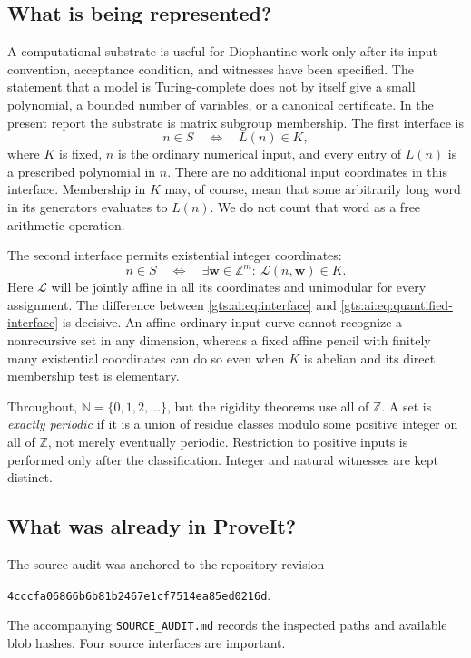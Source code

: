 \documentclass[11pt,letterpaper]{article}
\theoremstyle{definition}
\theoremstyle{remark}
\newcommand{\Z}{\mathbb Z}
\newcommand{\N}{\mathbb N}
\begin{document}
\subsection{What is being represented?}
A computational substrate is useful for Diophantine work only after its input convention, acceptance condition, and witnesses have been specified. The statement that a model is Turing-complete does not by itself give a small polynomial, a bounded number of variables, or a canonical certificate. In the present report the substrate is matrix subgroup membership. The first interface is
\begin{equation}\label{gts:ai:eq:interface}
 n\in S \quad\Longleftrightarrow\quad L(n)\in K,
\end{equation}
where $K$ is fixed, $n$ is the ordinary numerical input, and every entry of $L(n)$ is a prescribed polynomial in $n$. There are no additional input coordinates in this interface. Membership in $K$ may, of course, mean that some arbitrarily long word in its generators evaluates to $L(n)$. We do not count that word as a free arithmetic operation.

The second interface permits existential integer coordinates:
\begin{equation}\label{gts:ai:eq:quantified-interface}
 n\in S \quad\Longleftrightarrow\quad
 \exists\mathbf w\in\Z^m:\ \mathcal L(n,\mathbf w)\in K.
\end{equation}
Here $\mathcal L$ will be jointly affine in all its coordinates and unimodular for every assignment. The difference between \eqref{gts:ai:eq:interface} and \eqref{gts:ai:eq:quantified-interface} is decisive. An affine ordinary-input curve cannot recognize a nonrecursive set in any dimension, whereas a fixed affine pencil with finitely many existential coordinates can do so even when $K$ is abelian and its direct membership test is elementary.

Throughout, $\N=\{0,1,2,\ldots\}$, but the rigidity theorems use all of $\Z$. A set is \emph{exactly periodic} if it is a union of residue classes modulo some positive integer on all of $\Z$, not merely eventually periodic. Restriction to positive inputs is performed only after the classification. Integer and natural witnesses are kept distinct.

\subsection{What was already in ProveIt?}
The source audit was anchored to the repository revision
\begin{center}\small\texttt{4cccfa06866b6b81b2467e1cf7514ea85ed0216d}.\end{center}
The accompanying \texttt{SOURCE\_AUDIT.md} records the inspected paths and available blob hashes. Four source interfaces are important.
\end{document}
